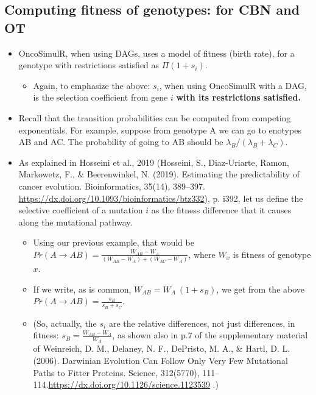 \documentclass[11pt]{article}
\begin{document}
\subsection{Computing fitness of genotypes: for CBN and OT}
\label{sec:org65f3210}
\begin{itemize}
\item OncoSimulR, when using DAGs, uses a model of fitness (birth rate), for a  genotype with restrictions satisfied as \(\Pi (1 + s_i)\). 
\begin{itemize}
\item Again, to emphasize the above: \(s_i\), when using OncoSimulR with a DAG, is  the selection coefficient from gene \(i\) \textbf{with its restrictions satisfied.}
\end{itemize}
\item Recall that the transition probabilities can be computed from competing   exponentials. For example, suppose from genotype A we can go to enotypes AB and AC. The probability of going to AB should be \(\lambda_B/(\lambda_B +  \lambda_C)\).
\item As explained in Hosseini et al., 2019 (Hosseini, S., Diaz-Uriarte, Ramon, Markowetz, F., \& Beerenwinkel, N. (2019). Estimating the predictability of cancer evolution. Bioinformatics,   35(14), 389–397. \url{https://dx.doi.org/10.1093/bioinformatics/btz332}), p. i392, let us define the selective  coefficient of a mutation \(i\) as the fitness difference that it causes along the mutational pathway.

\begin{itemize}
\item Using our previous example, that would be \(Pr(A \rightarrow AB) = \frac{W_{AB}- W_{A}}{(W_{AB} - W_A) + (W_{AC} - W_A)}\), where \(W_x\) is fitness of  genotype \(x\).

\item If we write, as is common, \(W_{AB} = W_A \  (1 + s_B)\), we get from the above \(Pr(A \rightarrow AB) = \frac{s_B}{s_B + s_C}\).

\item (So, actually, the \(s_i\) are the relative differences, not just
differences, in fitness: \(s_B = \frac{W_{AB} - W_A}{W_A}\), as shown also in p.7 of the supplementary material of Weinreich, D. M., Delaney, N. F., DePristo, M. A., \& Hartl, D. L. (2006). Darwinian Evolution Can Follow Only Very Few Mutational Paths to Fitter Proteins. Science, 312(5770), 111–114.\url{https://dx.doi.org/10.1126/science.1123539} .)


\end{itemize}
\end{itemize}
\end{document}
